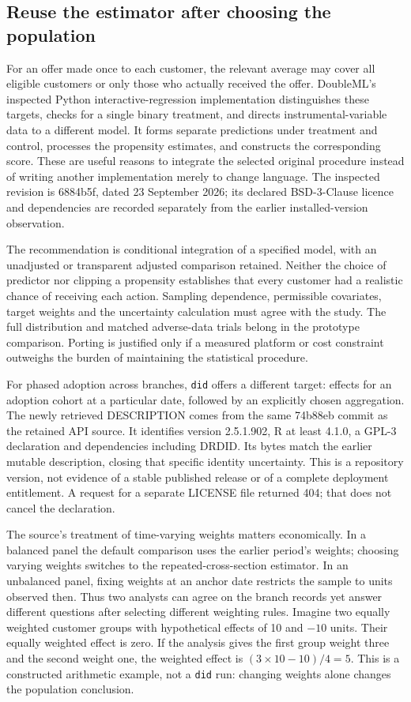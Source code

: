 \subsection{Reuse the estimator after choosing the population}
For an offer made once to each customer, the relevant average may cover all
eligible customers or only those who actually received the offer. DoubleML's
inspected Python interactive-regression implementation distinguishes these
targets, checks for a single binary treatment, and directs instrumental-variable
data to a different model. It forms separate predictions under treatment and
control, processes the propensity estimates, and constructs the corresponding
score. These are useful reasons to integrate the selected original procedure
instead of writing another implementation merely to change language.
The inspected revision is 6884b5f, dated 23 September 2026; its declared
BSD-3-Clause licence and dependencies are recorded separately from the earlier
installed-version observation. \citep{exec23_doubleml_reuse_source}

The recommendation is conditional integration of a specified model, with an
unadjusted or transparent adjusted comparison retained. Neither the choice of
predictor nor clipping a propensity establishes that every customer had a
realistic chance of receiving each action. Sampling dependence, permissible
covariates, target weights and the uncertainty calculation must agree with the
study. The full distribution and matched adverse-data trials belong in the
prototype comparison. Porting is justified only if a measured platform or
cost constraint outweighs the burden of maintaining the statistical procedure.

For phased adoption across branches, \texttt{did} offers a different target:
effects for an adoption cohort at a particular date, followed by an explicitly
chosen aggregation. The newly retrieved DESCRIPTION comes from the same
74b88eb commit as the retained API source. It identifies version 2.5.1.902,
R at least 4.1.0, a GPL-3 declaration and dependencies including DRDID.
Its bytes match the earlier mutable description, closing that specific
identity uncertainty. This is a repository version, not evidence of a stable
published release or of a complete deployment entitlement. A request for a
separate LICENSE file returned 404; that does not cancel the declaration.
\citep{survey29did,exec24_panelr_did}

The source's treatment of time-varying weights matters economically. In a
balanced panel the default comparison uses the earlier period's weights;
choosing varying weights switches to the repeated-cross-section estimator.
In an unbalanced panel, fixing weights at an anchor date restricts the sample
to units observed then. Thus two analysts can agree on the branch records yet
answer different questions after selecting different weighting rules. Imagine
two equally weighted customer groups with hypothetical effects of 10 and
$-10$ units. Their equally weighted effect is zero. If the analysis gives
the first group weight three and the second weight one, the weighted effect
is $(3\times10-10)/4=5$. This is a constructed arithmetic example, not a
\texttt{did} run: changing weights alone changes the population conclusion.
\citep{survey29didapi}


